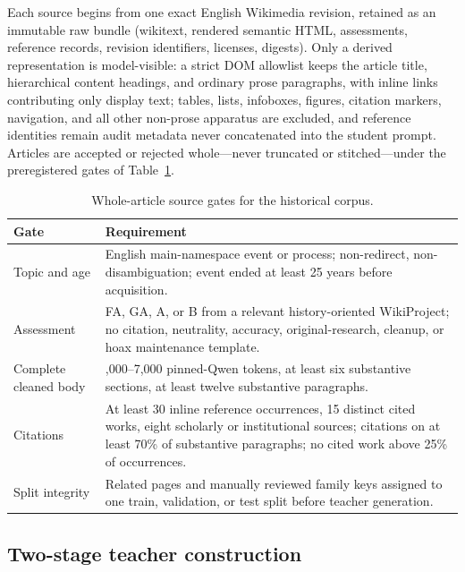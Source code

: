 \documentclass[10pt]{article}
\begin{document}
Each source begins from one exact English Wikimedia revision, retained as an
immutable raw bundle (wikitext, rendered semantic HTML, assessments,
reference records, revision identifiers, licenses, digests). Only a derived
representation is model-visible: a strict DOM allowlist keeps the article
title, hierarchical content headings, and ordinary prose paragraphs, with
inline links contributing only display text; tables, lists, infoboxes,
figures, citation markers, navigation, and all other non-prose apparatus are
excluded, and reference identities remain audit metadata never concatenated
into the student prompt. Articles are accepted or rejected whole---never
truncated or stitched---under the preregistered gates of
Table~\ref{tab:sourcegates}.

\begin{table}[htbp]
\centering
\small
\begin{tabularx}{\textwidth}{
>{\raggedright\arraybackslash}p{}
>{\raggedright\arraybackslash}X}
\toprule
Gate & Requirement \\
\midrule
Topic and age &
English main-namespace event or process; non-redirect, non-disambiguation;
event ended at least 25 years before acquisition. \\
Assessment &
FA, GA, A, or B from a relevant history-oriented WikiProject; no citation,
neutrality, accuracy, original-research, cleanup, or hoax maintenance
template. \\
Complete cleaned body &
3,000--7,000 pinned-Qwen tokens, at least six substantive sections, at least
twelve substantive paragraphs. \\
Citations &
At least 30 inline reference occurrences, 15 distinct cited works, eight
scholarly or institutional sources; citations on at least 70\% of
substantive paragraphs; no cited work above 25\% of occurrences. \\
Split integrity &
Related pages and manually reviewed family keys assigned to one train,
validation, or test split before teacher generation. \\
\bottomrule
\end{tabularx}
\caption{Whole-article source gates for the historical corpus.}
\label{tab:sourcegates}
\end{table}

\subsection{Two-stage teacher construction}
\end{document}
